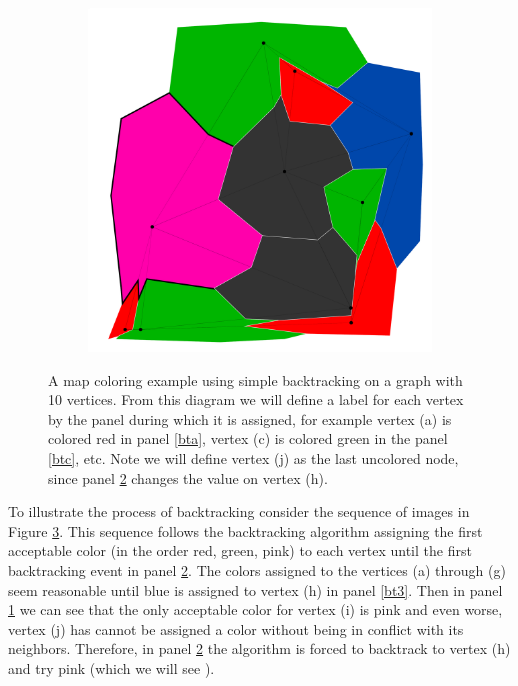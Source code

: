 \documentclass{article}
\begin{document}
\begin{figure}[h!]
\begin{subfigure}{0.18\textwidth}
				\caption{}
				\label{bt4}
			\end{subfigure}
			\;
			\begin{subfigure}{0.18\textwidth}
				\centering
				\includegraphics[width=\textwidth]{images/sequences/simple_backtracking/bt_simple_I00024}
				\caption{}
				\label{bt5}
			\end{subfigure}

			\caption{A map coloring example using simple backtracking on a graph with 10 vertices. From this diagram we will define a label for each vertex by the panel during which it is assigned, for example vertex (a) is colored red in panel \ref{bta}, vertex (c) is colored green in the panel \ref{btc}, etc. Note we will define vertex (j) as the last uncolored node, since panel \ref{bt5} changes the value on vertex (h).}
			\label{simple_ex}
		\end{figure}	
		
		To illustrate the process of backtracking consider the sequence of images in Figure \ref{simple_ex}.
		This sequence follows the backtracking algorithm assigning the first acceptable color (in the order red, green, pink) to each vertex until the first backtracking event in panel \ref{bt5}. The colors assigned to the vertices (a) through (g) seem reasonable until blue is assigned to vertex (h) in panel \ref{bt3}. Then in panel \ref{bt4} we can see that the only acceptable color for vertex (i) is pink and even worse, vertex (j) has cannot be assigned a color without being in conflict with its neighbors. Therefore, in panel \ref{bt5} the algorithm is forced to backtrack to vertex (h) and try pink (which we will see ).
		
\end{document}
